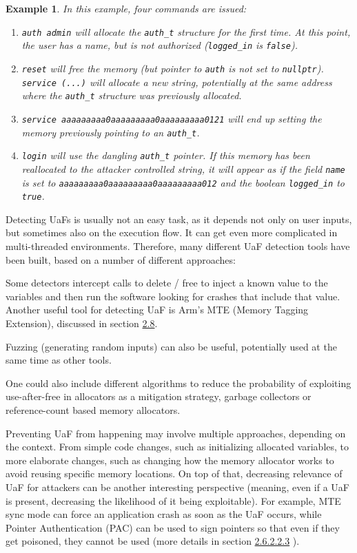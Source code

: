 \documentclass[
  a4paper,
]{report}
\newtheorem{example}{Example}
\begin{document}
\begin{example}
In this example, four commands are issued:

\begin{enumerate}
\def\labelenumi{\arabic{enumi})}
\item
  \texttt{auth\ admin} will allocate the \texttt{auth\_t} structure for
  the first time. At this point, the user has a name, but is not
  authorized (\texttt{logged\_in} is \texttt{false}).
\item
  \texttt{reset} will free the memory (but pointer to \texttt{auth} is
  not set to \texttt{nullptr}). \texttt{service\ (...)} will allocate a
  new string, potentially at the same address where the \texttt{auth\_t}
  structure was previously allocated.
\item
  \texttt{service\ aaaaaaaaa0aaaaaaaaa0aaaaaaaaa0121} will end up
  setting the memory previously pointing to an \texttt{auth\_t}.
\item
  \texttt{login} will use the dangling \texttt{auth\_t} pointer. If this
  memory has been reallocated to the attacker controlled string, it will
  appear as if the field \texttt{name} is set to
  \texttt{aaaaaaaaa0aaaaaaaaa0aaaaaaaaa012} and the boolean
  \texttt{logged\_in} to \texttt{true}.
\end{enumerate}

\end{example}

Detecting UaFs is usually not an easy task, as it depends not only on
user inputs, but sometimes also on the execution flow. It can get even
more complicated in multi-threaded environments. Therefore, many
different UaF detection tools have been built, based on a number of
different approaches:

Some detectors intercept calls to delete / free to inject a known value
to the variables and then run the software looking for crashes that
include that value. Another useful tool for detecting UaF is Arm's MTE
(Memory Tagging Extension), discussed in section
\hyperref[sec:preventing-and-detecting-memory-errors]{2.8}.

Fuzzing (generating random inputs) can also be useful, potentially used
at the same time as other tools.

One could also include different algorithms to reduce the probability of
exploiting use-after-free in allocators as a mitigation strategy,
garbage collectors or reference-count based memory allocators.

Preventing UaF from happening may involve multiple approaches, depending
on the context. From simple code changes, such as initializing allocated
variables, to more elaborate changes, such as changing how the memory
allocator works to avoid reusing specific memory locations. On top of
that, decreasing relevance of UaF for attackers can be another
interesting perspective (meaning, even if a UaF is present, decreasing
the likelihood of it being exploitable). For example, MTE sync mode can
force an application crash as soon as the UaF occurs, while Pointer
Authentication (PAC) can be used to sign pointers so that even if they
get poisoned, they cannot be used (more details in section
\hyperref[sec:pointer-authentication]{2.6.2.2.3} ).
\end{document}
